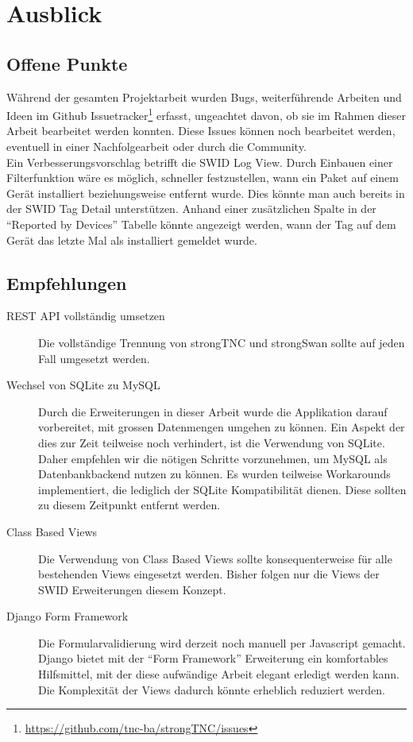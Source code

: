 \chapter{Ausblick}

\section{Offene Punkte} 
Während der gesamten Projektarbeit wurden Bugs, weiterführende Arbeiten und
Ideen im Github
Issuetracker\footnote{\url{https://github.com/tnc-ba/strongTNC/issues}} erfasst,
ungeachtet davon, ob sie im Rahmen dieser Arbeit bearbeitet werden konnten.
Diese Issues können noch bearbeitet werden, eventuell in einer Nachfolgearbeit
oder durch die Community.\\
Ein Verbesserungsvorschlag betrifft die SWID Log View. Durch Einbauen
einer Filterfunktion wäre es möglich, schneller festzustellen, wann ein Paket auf
einem Gerät installiert beziehungsweise entfernt wurde. Dies könnte man auch
bereits in der SWID Tag Detail unterstützen. Anhand einer zusätzlichen Spalte in
der \enquote{Reported by Devices} Tabelle könnte angezeigt werden, wann der Tag
auf dem Gerät das letzte Mal als installiert gemeldet wurde.


\section{Empfehlungen} 

\begin{description} 

	\item[REST API vollständig umsetzen] Die vollständige Trennung von strongTNC
	und strongSwan sollte auf jeden Fall umgesetzt werden.
	
	\item[Wechsel von SQLite zu MySQL] Durch die Erweiterungen in dieser Arbeit
	wurde die Applikation darauf vorbereitet, mit grossen Datenmengen umgehen zu
	können. Ein Aspekt der dies zur Zeit teilweise noch verhindert, ist die
	Verwendung von SQLite. Daher empfehlen wir die nötigen Schritte vorzunehmen, um
	MySQL als Datenbankbackend nutzen zu können. Es wurden teilweise Workarounds
	implementiert, die lediglich der SQLite Kompatibilität dienen. Diese sollten zu
	diesem Zeitpunkt entfernt werden.
	
	\item[Class Based Views] Die Verwendung von Class Based Views sollte
	konsequenterweise für alle bestehenden Views eingesetzt werden. Bisher folgen
	nur die Views der SWID Erweiterungen diesem Konzept.
	
	\item[Django Form Framework] Die Formularvalidierung wird derzeit noch manuell
	per Javascript gemacht. Django bietet mit der \enquote{Form Framework}
	Erweiterung ein komfortables Hilfsmittel, mit der diese aufwändige Arbeit
	elegant erledigt werden kann. Die Komplexität der Views dadurch könnte
	erheblich reduziert werden.
	
\end{description}